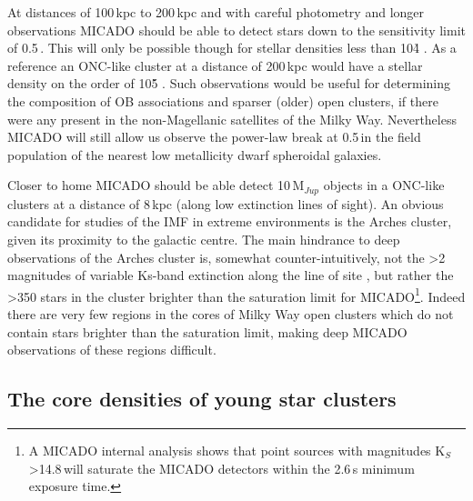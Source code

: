 
At distances of 100\,kpc to 200\,kpc and with careful photometry and longer observations MICADO should be able to detect stars down to the sensitivity limit of 0.5\,\msun. 
This will only be possible though for stellar densities less than 10\h4 \spa. 
As a reference an ONC-like cluster at a distance of 200\,kpc would have a stellar density on the order of 10\h5 \spa. 
Such observations would be useful for determining the composition of OB associations and sparser (older) open clusters, if there were any present in the non-Magellanic satellites of the Milky Way. 
Nevertheless MICADO will still allow us observe the power-law break at 0.5\,\msun in the field population of the nearest low metallicity dwarf spheroidal galaxies.

Closer to home MICADO should be able detect 10\,M$_{Jup}$ objects in a ONC-like clusters at a distance of 8\,kpc (along low extinction lines of sight). 
An obvious candidate for studies of the IMF in extreme environments is the Arches cluster, given its proximity to the galactic centre.
The main hindrance to deep observations of the Arches cluster is, somewhat counter-intuitively, not the \textgreater2 magnitudes of variable Ks-band extinction along the line of site \citep{espinoza2009}, but rather the \textgreater350 stars in the cluster \citep{galacticnucleaus} brighter than the saturation limit for MICADO\footnote{A MICADO internal analysis shows that point sources with magnitudes K$_S$\textgreater14.8\,\m will saturate the MICADO detectors within the 2.6\,s minimum exposure time.}.
Indeed there are very few regions in the cores of Milky Way open clusters which do not contain stars brighter than the saturation limit, making deep MICADO observations of these regions difficult.


\subsection{The core densities of young star clusters}

